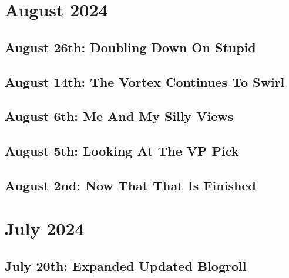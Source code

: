 \documentclass[12pt,letterpaper]{report}
\begin{document}
\section{August 2024}
\subsection{August 26th: Doubling Down On Stupid}

\subsection{August 14th: The Vortex Continues To Swirl}

\subsection{August 6th: Me And My Silly Views}

\subsection{August 5th: Looking At The VP Pick}

\subsection{August 2nd: Now That That Is Finished}

\section{July 2024}
\subsection{July 20th: Expanded Updated Blogroll}

\end{document}
